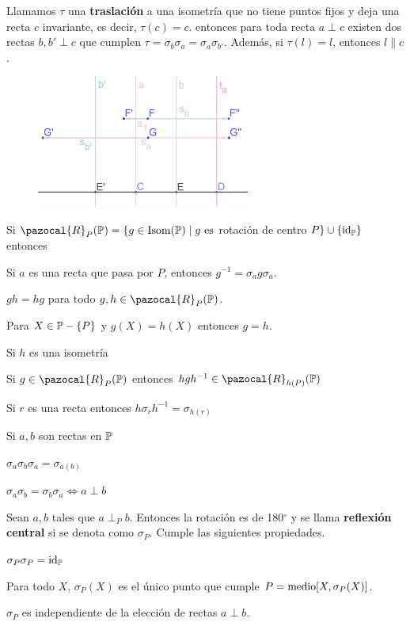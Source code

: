  Llamamos $\tau$ una \textbf{traslación} a una isometría que no tiene puntos fijos y deja una recta $c$ invariante, es decir, $\tau(c) = c$. entonces para toda recta $a\perp c$ existen dos rectas $b,b' \perp c$ que cumplen $\tau = \sigma_b\sigma_a = \sigma_a\sigma_{b'}$. Además, si $\tau(l) = l$, entonces $l \parallel c$.

\begin{figure}[H]
	\centering
	\includegraphics[width=7cm]{figuras/3-1.png}
	\vspace{-1em}
\end{figure}

 Si $\pazocal{R}_P(\P) = \{g\in \iso(\P) \;|\; g \text{ es} $ 
	\linebreak
	rotación de centro $ P \} \cup \{ \text{id}_\P \}$ entonces
	\begin{itemizex}
		\item Si $a$ es una recta que pasa por $P$, entonces $g^{-1} = \sigma_a g \sigma_a$.
		\item $gh = hg$ para todo $g,h \in \pazocal{R}_P(\P)$.
		\item Para $X \in \P - \{P\}$ y $g(X) = h(X)$ entonces $g = h$.
	\end{itemizex}

 Si $h$ es una isometría
 	\begin{itemizex}
 	\item Si $g \in \pazocal{R}_P(\P)$ entonces $hgh^{-1} \in \pazocal{R}_{h(P)}(\P)$
 	\item Si $r$ es una recta entonces $h\sigma_rh^{-1} = \sigma_{h(r)}$
	\end{itemizex}

 Si $a, b$ son rectas en $\P$
	\begin{itemizex}
	 	\item $\sigma_a\sigma_b\sigma_a = \sigma_{a(b)}$
	 	\item $\sigma_a\sigma_b = \sigma_b\sigma_a \iff a \perp b$
	\end{itemizex}

 Sean $a,b$ tales que $a\perp_P b$. Entonces la rotación es de 180$^\circ$ y se
llama \textbf{reflexión central} si se denota como $\sigma_P$. Cumple las siguientes propiedades.
	\begin{itemizex}
		\item $\sigma_P\sigma_P= \text{id}_\P$
		\item Para todo $X$, $\sigma_P(X)$ es el único punto que cumple $P = \m[X, \sigma_P(X)]$.
		\item $\sigma_P$ es independiente de la elección de rectas $a\perp b$.
	\end{itemizex}

